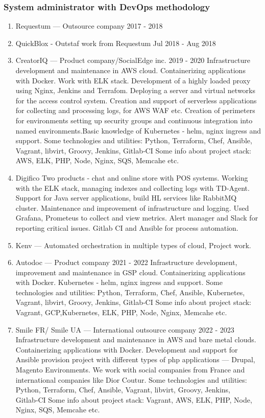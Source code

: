 \documentclass[11pt]{article}
\begin{document}
\subsubsection{System administrator with DevOps methodology}
\label{sec:orgc2d41dc}
\begin{enumerate}
\item Requestum — Outsource company 2017 - 2018
\label{sec:org60710b4}
\item QuickBlox - Outstaf work from Requestum Jul 2018 - Aug 2018
\label{sec:orga4f8036}
\item CreatorIQ — Product company/SocialEdge inc. 2019 - 2020
\label{sec:org1682cd6}
Infrastructure development and maintenance in AWS cloud.
Containerizing applications with Docker.
Work with ELK stack.
Development of a highly loaded proxy using Nginx, Jenkins and Terrafom.
Deploying a server and virtual networks for the access control system.
Creation and support of serverless applications for collecting and processing logs, for AWS WAF etc.
Creation of perimeters for environments setting up security groups and continuous integration into named
environments.Basic knowledge of
Kubernetes ‑ helm, nginx ingress and support.
Some technologies and utilities: Python, Terraform, Chef, Ansible, Vagrant, libvirt, Groovy, Jenkins, Gitlab‑CI
Some info about project stack: AWS, ELK, PHP, Node, Nginx, SQS, Memcahe etc.
\item Digifico
\label{sec:orgdaffdd4}
Two products ‑ chat and online store with POS systems.
Working with the ELK stack, managing indexes and collecting logs with TD‑Agent.
Support for Java server applications, build HL services like RabbitMQ cluster.
Maintenance and improvement of infrastructure and logging.
Used Grafana, Prometeus to collect and view metrics. Alert manager and Slack for reporting critical issues.
Gitlab CI and Ansible for process automation.
\item Kenv — Automated orchestration in multiple types of cloud, Project work.
\label{sec:orga7a5b95}
\item Autodoc — Product company 2021 - 2022
\label{sec:orgb862eb7}
Infrastructure development, improvement and maintenance in GSP cloud.
Containerizing applications with Docker.
Kubernetes ‑ helm, nginx ingress and support.
Some technologies and utilities: Python, Terraform, Chef, Ansible, Kubernetes, Vagrant, libvirt, Groovy, Jenkins, Gitlab‑CI
Some info about project stack: Vagrant, GCP,Kubernetes, ELK, PHP, Node, Nginx, Memcahe etc.
\item Smile FR/ Smile UA — International outsource company 2022 - 2023
\label{sec:orgdd3c82b}
Infrastructure development and maintenance in AWS and bare metal clouds.
Containerizing applications with Docker.
Development and support for Ansible provision project with different types of php applications — Drupal, Magento
Environments. We work with social companies from France and international companies like Dior Coutur.
Some technologies and utilities: Python, Terraform, Chef, Ansible, Vagrant, libvirt, Groovy, Jenkins, Gitlab‑CI
Some info about project stack: Vagrant, AWS, ELK, PHP, Node, Nginx, SQS, Memcahe etc.
\end{enumerate}
\end{document}
